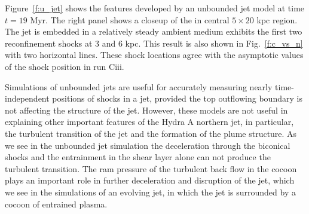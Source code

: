 Figure~\ref{f:u_jet} shows the features developed by an unbounded jet model at time $t=19$ Myr. The right panel shows a closeup of the in central $5\times20$ kpc region. The jet is embedded in a relatively steady ambient medium exhibits the first two reconfinement shocks at 3 and 6 kpc. This result is also shown in Fig.~\ref{f:c_vs_n} with two horizontal lines. These shock locations agree with the asymptotic values of the shock position in run Ciii. 

Simulations of unbounded jets are useful for accurately measuring nearly time-independent positions of shocks in a jet, provided the top outflowing boundary is not affecting the structure of the jet. However, these models are not useful in explaining other important features of the Hydra A northern jet, in particular, the turbulent transition of the jet and the formation of the plume structure. As we see in the unbounded jet simulation the deceleration through the biconical shocks and the entrainment in the shear layer alone can not produce the turbulent transition. The ram pressure of the turbulent back flow in the cocoon plays an important role in further deceleration and disruption of the jet, which we see in the simulations of an evolving jet, in which the jet is surrounded by a cocoon of entrained plasma. 


